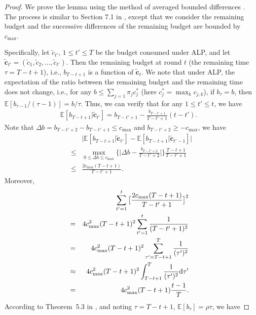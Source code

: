 \begin{proof}
We prove the lemma using the method of averaged bounded differences \cite{Dubhashi2009Concentration}. The process is similar to Section 7.1 in \cite{Dubhashi2009Concentration}, except that we consider the remaining budget and the successive differences of the remaining budget are bounded by $c_{\max}$.

Specifically, let $\tilde{c}_{t'}$, $1 \leq t' \leq T$ be the budget consumed under ALP, and let $\tilde{\boldsymbol{c}}_{t'} = (\tilde{c}_{1}, \tilde{c}_{2}, \ldots, \tilde{c}_{t'})$. Then the remaining budget at round $t$ (the remaining time $\tau = T-t+1$), i.e.,  $b_{T-t+1}$ is a function of $\tilde{\boldsymbol{c}}_t$. We note that under ALP, the expectation of the ratio between the remaining budget and the remaining time does not change, i.e., for any $b\leq \sum_{j = 1}\pi_j c_j^*$ (here $c_j^* = \max_k c_{j,k}$), if $b_{\tau} = b$, then $\mathbb{E}[b_{\tau-1}/(\tau-1)] =b/\tau$. Thus, we can verify that for any $1\leq t' \leq t$, we have
\begin{eqnarray}
\mathbb{E}[b_{T-t+1}|\tilde{\boldsymbol{c}}_{t'}] = b_{T - t' + 1} - \frac{b_{T - t' + 1}}{T-t'+1}(t - t').
\end{eqnarray}
Note that $\Delta b = b_{T - t' + 2} - b_{T - t' + 1}  \leq c_{\max}$ and $b_{T - t' + 2} \geq -c_{\max}$, we have
\begin{eqnarray}
&&\big|\mathbb{E}[b_{T-t+1}|\tilde{\boldsymbol{c}}_{t'}] - \mathbb{E}[b_{T-t+1}|\tilde{\boldsymbol{c}}_{t'-1}]\big| \nonumber \\
&\leq &  \max_{0 \leq \Delta b \leq c_{\max}}\bigg\{\big|\Delta b - \frac{b_{T - t' + 2}}{T - t' + 2}\big|  \bigg\} \frac{T - t+1}{T - t' + 1}\nonumber \\
&\leq & \frac{2 c_{\max}(T - t+1)}{T - t' + 1}.
\end{eqnarray}
Moreover,
\begin{eqnarray}
&&\sum_{t' = 1}^t \big[\frac{2 c_{\max}(T - t+1)}{T - t' + 1}\big]^2 \nonumber \\
& =&  4 c_{\max}^2(T - t+1)^2\sum_{t' = 1}^t\frac{1}{(T - t' + 1)^2}\nonumber \\
& =&  4 c_{\max}^2(T - t+1)^2\sum_{\tau' = T - t+1}^{T}\frac{1}{(\tau')^2}\nonumber \\
&\approx &4 c_{\max}^2(T - t+1)^2\int_{T - t+1}^{T}\frac{1}{(\tau')^2}{\rm d}\tau'\nonumber\\
&= & 4 c_{\max}^2(T - t+1)\frac{t-1}{T}.
\end{eqnarray}
According to Theorem~5.3 in \cite{Dubhashi2009Concentration}, and noting $\tau = T-t+1$, $\mathbb{E}[b_{\tau}] = \rho\tau$, we have

\end{proof}

